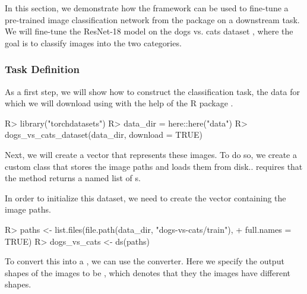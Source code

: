 \documentclass[article]{jss}
\theoremstyle{definition}
\begin{document}
In this section, we demonstrate how the  framework can be used to fine-tune a pre-trained image classification network from the  package on a downstream task.
We will fine-tune the ResNet-18 model \citep{ref-he2015deepresiduallearningimage} on the dogs vs. cats dataset \citep{ref-dogs-vs-cats2013}, where the goal is to classify images into the two categories.

\subsubsection{Task Definition}

As a first step, we will show how to construct the classification task, the data for which we will download using with the help of the  R package \citep{torchdatasets}.

\begin{CodeInput}
R> library("torchdatasets")
R> data_dir = here::here("data")
R> dogs_vs_cats_dataset(data_dir, download = TRUE)
\end{CodeInput}

Next, we will create a  vector that represents these images.
To do so, we create a custom  class that stores the image paths and loads them from disk..
 requires that the  method returns a named list of s.


In order to initialize this dataset, we need to create the vector containing the image paths.

\begin{CodeInput}
R> paths <- list.files(file.path(data_dir, "dogs-vs-cats/train"),
+    full.names = TRUE)
R> dogs_vs_cats <- ds(paths)
\end{CodeInput}

To convert this into a , we can use the  converter.
Here we specify the output shapes of the images to be , which denotes that they the images have different shapes.
\end{document}
